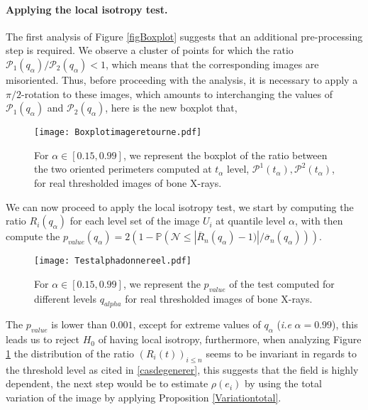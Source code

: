 \documentclass[12pt]{article}
\theoremstyle{Theorem}
\theoremstyle{definition}
\begin{document}
\paragraph{Applying the local isotropy test.}The first analysis of Figure \ref{figBoxplot} suggests that an additional pre-processing step is required. We observe a cluster of points for which the ratio $\mathcal{P}_{1}(q_{\alpha})/\mathcal{P}_{2}(q_{\alpha}) < 1$, which means that the corresponding images are misoriented. Thus, before proceeding with the analysis, it is necessary to apply a $\pi/2$-rotation to these images, which amounts to interchanging the values of $\mathcal{P}_{1}(q_{\alpha})$ and $ \mathcal{P}_{2}(q_{\alpha})$, here is the new boxplot that,
\vspace{-0.5cm}
\begin{figure}[H]
  \centering
    {\texttt{[image: Boxplotimageretourne.pdf]}}
    \hspace{0.2cm}
 \caption{For $\alpha \in [0.15, 0.99]$, we represent the boxplot of the ratio between the two oriented perimeters computed at $t_{\alpha}$ level, $\mathcal{P}^{1}(t_{\alpha}), \mathcal{P}^{2}(t_{\alpha})$, for real thresholded images of bone X-rays.}
\label{Boxplotretournee}
\end{figure}
\vspace{-0.5cm}
We can now proceed to apply the local isotropy test, we start by computing the ratio $R_{i}(q_{\alpha})$ for each level set of the image $U_{i}$ at quantile level $\alpha$, with then compute the $p_{value}(q_{\alpha}) = 2(1-\mathbb{P}\left(\mathcal{N} \leq \left|\overline{R}_{n}(q_{\alpha}) - 1)\right|/\overline{\sigma}_{n}(q_{\alpha})\right))$. 
\begin{figure}[H]
  \centering
    {\texttt{[image: Testalphadonnereel.pdf]}}
    \hspace{0.2cm}
 \caption{For $\alpha \in [0.15, 0.99]$, we represent the $p_{value}$ of the test computed for different levels $q_{alpha}$ for real thresholded images of bone X-rays.}
\end{figure}
The $p_{value}$ is lower than $0.001$, except for extreme values of $q_{\alpha}$ (\textit{i.e} $\alpha = 0.99$), this leads us to reject $H_{0}$ of having local isotropy, furthermore, when analyzing Figure \ref{Boxplotretournee} the distribution of the ratio $\left(R_{i}(t)\right)_{i\leq n}$ seems to be invariant in regards to the threshold level as cited in \ref{casdegenerer}, this suggests that the field is highly dependent, the next step would be to estimate $\rho(e_i)$ by using the total variation of the image by applying Proposition \ref{Variationtotal}. 
\end{document}
